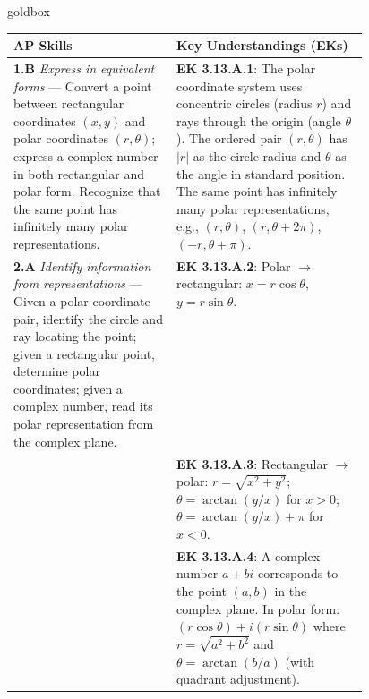 \documentclass[10pt]{article}
\begin{document}
\begin{skillbox}{goldbox}
\begin{tabularx}{\linewidth}{@{} p{0.46\linewidth} X @{}}
\textbf{AP Skills} & \textbf{Key Understandings (EKs)} \\
\midrule
\textbf{1.B} \textit{Express in equivalent forms} ---
  Convert a point between rectangular coordinates $(x,y)$ and polar
  coordinates $(r,\theta)$; express a complex number in both rectangular
  and polar form. Recognize that the same point has infinitely many polar
  representations.
&
\textbf{EK 3.13.A.1}: The polar coordinate system uses concentric circles
(radius $r$) and rays through the origin (angle $\theta$). The ordered pair
$(r,\theta)$ has $|r|$ as the circle radius and $\theta$ as the angle in
standard position. The same point has infinitely many polar representations,
e.g., $(r,\theta)$, $(r,\theta+2\pi)$, $(-r,\theta+\pi)$. \\[4pt]

\textbf{2.A} \textit{Identify information from representations} ---
  Given a polar coordinate pair, identify the circle and ray locating the
  point; given a rectangular point, determine polar coordinates; given a
  complex number, read its polar representation from the complex plane.
&
\textbf{EK 3.13.A.2}: Polar $\to$ rectangular: $x = r\cos\theta$,
$y = r\sin\theta$. \\[4pt]

&
\textbf{EK 3.13.A.3}: Rectangular $\to$ polar: $r = \sqrt{x^2+y^2}$;
$\theta = \arctan(y/x)$ for $x>0$; $\theta = \arctan(y/x)+\pi$ for $x<0$. \\[4pt]

&
\textbf{EK 3.13.A.4}: A complex number $a+bi$ corresponds to the point
$(a,b)$ in the complex plane. In polar form: $(r\cos\theta)+i(r\sin\theta)$
where $r = \sqrt{a^2+b^2}$ and $\theta = \arctan(b/a)$ (with quadrant
adjustment). \\
\end{tabularx}
\end{skillbox}

\vspace{0.08in}
\end{document}
